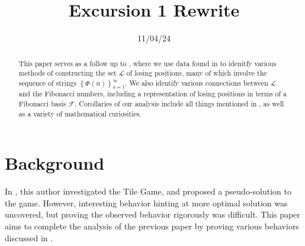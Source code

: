 \documentclass[11pt, letterpaper]{article}
\title{Excursion 1 Rewrite}
\date{11/04/24}
\begin{document}
\makereport
\setcounter{page}{0}
\begin{abstract}
	This paper serves as a follow up to \cite{exc}, where we use data found in \cite{exc} to idenitfy various methods of constructing the set $\mathcal{L} $ of losing positions, many of which involve the sequence of strings $\left\{\Phi (n)\right\}_{n=1}^\infty$. We also identify various connections between $\mathcal{L} $ and the Fibonacci numbers, including a representation of losing positions in terms of a Fibonacci basis $\mathcal{F} $. Corollaries of our analysis include all things mentioned in \cite{more}, as well as a variety of mathematical curiosities.
\end{abstract}
\tableofcontents
\newpage
\section{Background}
In \cite{exc}, this author investigated the Tile Game, and proposed a pseudo-solution to the game. However, interesting behavior hinting at more optimal solution was uncovered, but proving the observed behavior rigorously was difficult. This paper aims to complete the analysis of the previous paper by proving various behaviors discussed in \cite{exc}.
\end{document}
